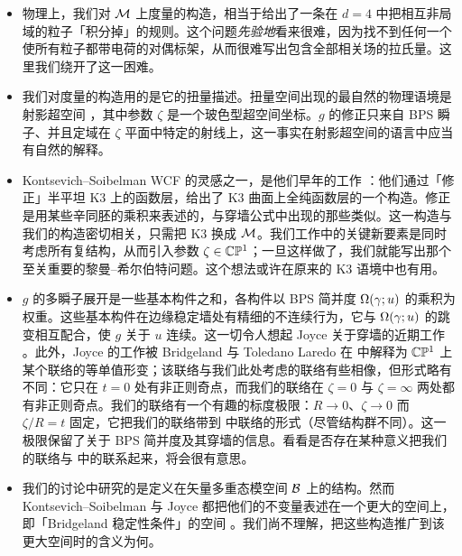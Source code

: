 \begin{itemize}
\item 物理上，我们对 $\mathcal{M}$ 上度量的构造，相当于给出了一条在 $d=4$ 中把相互非局域的粒子「积分掉」的规则。这个问题\emph{先验地}看来很难，因为找不到任何一个使所有粒子都带电荷的对偶标架，从而很难写出包含全部相关场的拉氏量。这里我们绕开了这一困难。

\item 我们对度量的构造用的是它的扭量描述。扭量空间出现的最自然的物理语境是射影超空间 \cite{Karlhede:1984vr,Lindstrom:1987ks,Lindstrom:2008gs}，其中参数 $\zeta$ 是一个玻色型超空间坐标。$g$ 的修正只来自 BPS 瞬子、并且定域在 $\zeta$ 平面中特定的射线上，这一事实在射影超空间的语言中应当有自然的解释。

\item Kontsevich--Soibelman WCF 的灵感之一，是他们早年的工作 \cite{MR2181810}：他们通过「修正」半平坦 K3 上的函数层，给出了 K3 曲面上全纯函数层的一个构造。修正是用某些辛同胚的乘积来表述的，与穿墙公式中出现的那些类似。这一构造与我们的构造密切相关，只需把 K3 换成 $\mathcal{M}$。我们工作中的关键新要素是同时考虑所有复结构，从而引入参数 $\zeta\in\mathbb{C}\mathbb{P}^1$；一旦这样做了，我们就能写出那个至关重要的黎曼--希尔伯特问题。这个想法或许在原来的 K3 语境中也有用。

\item $g$ 的多瞬子展开是一些基本构件之和，各构件以 BPS 简并度 $\Omega(\gamma;u)$ 的乘积为权重。这些基本构件在边缘稳定墙处有精细的不连续行为，它与 $\Omega(\gamma;u)$ 的跳变相互配合，使 $g$ 关于 $u$ 连续。这一切令人想起 Joyce 关于穿墙的近期工作 \cite{Joyce:2006pf}。此外，Joyce 的工作被 Bridgeland 与 Toledano Laredo 在 \cite{stab-stokes} 中解释为 $\mathbb{C}\mathbb{P}^1$ 上某个联络的等单值形变；该联络与我们此处考虑的联络有些相像，但形式略有不同：它只在 $t=0$ 处有非正则奇点，而我们的联络在 $\zeta=0$ 与 $\zeta=\infty$ 两处都有非正则奇点。我们的联络有一个有趣的标度极限：$R\to0$、$\zeta\to0$ 而 $\zeta/R=t$ 固定，它把我们的联络带到 \cite{stab-stokes} 中联络的形式（尽管结构群不同）。这一极限保留了关于 BPS 简并度及其穿墙的信息。看看是否存在某种意义把我们的联络与 \cite{stab-stokes} 中的联系起来，将会很有意思。

\item 我们的讨论中研究的是定义在矢量多重态模空间 $\mathcal{B}$ 上的结构。然而 Kontsevich--Soibelman 与 Joyce 都把他们的不变量表述在一个更大的空间上，即「Bridgeland 稳定性条件」的空间 \cite{MR2373143}。我们尚不理解，把这些构造推广到该更大空间时的含义为何。


\end{itemize}

